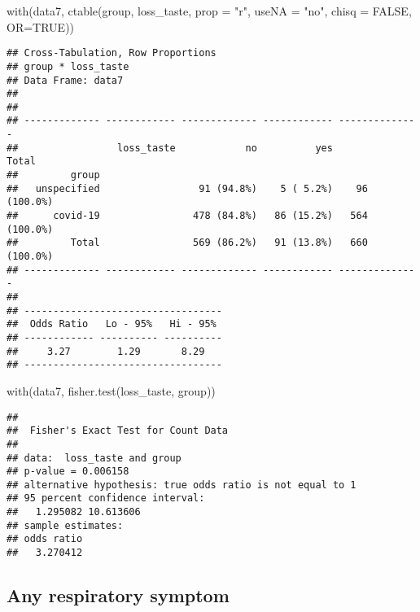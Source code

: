 \documentclass[
]{article}
\newenvironment{Shaded}{\begin{snugshade}}{\end{snugshade}}
\newcommand{\AttributeTok}[1]{\textcolor[rgb]{0.77,0.63,0.00}{#1}}
\newcommand{\ConstantTok}[1]{\textcolor[rgb]{0.00,0.00,0.00}{#1}}
\newcommand{\FunctionTok}[1]{\textcolor[rgb]{0.00,0.00,0.00}{#1}}
\newcommand{\NormalTok}[1]{#1}
\newcommand{\StringTok}[1]{\textcolor[rgb]{0.31,0.60,0.02}{#1}}
\begin{document}
\begin{Shaded}
\begin{Highlighting}[]
\FunctionTok{with}\NormalTok{(data7, }\FunctionTok{ctable}\NormalTok{(group, loss\_taste, }\AttributeTok{prop =} \StringTok{"r"}\NormalTok{, }\AttributeTok{useNA =} \StringTok{"no"}\NormalTok{, }\AttributeTok{chisq =} \ConstantTok{FALSE}\NormalTok{, }\AttributeTok{OR=}\ConstantTok{TRUE}\NormalTok{))}
\end{Highlighting}
\end{Shaded}

\begin{verbatim}
## Cross-Tabulation, Row Proportions  
## group * loss_taste  
## Data Frame: data7  
## 
## 
## ------------- ------------ ------------- ------------ --------------
##                 loss_taste            no          yes          Total
##         group                                                       
##   unspecified                 91 (94.8%)    5 ( 5.2%)    96 (100.0%)
##      covid-19                478 (84.8%)   86 (15.2%)   564 (100.0%)
##         Total                569 (86.2%)   91 (13.8%)   660 (100.0%)
## ------------- ------------ ------------- ------------ --------------
## 
## ----------------------------------
##  Odds Ratio   Lo - 95%   Hi - 95% 
## ------------ ---------- ----------
##     3.27        1.29       8.29   
## ----------------------------------
\end{verbatim}

\begin{Shaded}
\begin{Highlighting}[]
\FunctionTok{with}\NormalTok{(data7, }\FunctionTok{fisher.test}\NormalTok{(loss\_taste, group))}
\end{Highlighting}
\end{Shaded}

\begin{verbatim}
## 
##  Fisher's Exact Test for Count Data
## 
## data:  loss_taste and group
## p-value = 0.006158
## alternative hypothesis: true odds ratio is not equal to 1
## 95 percent confidence interval:
##   1.295082 10.613606
## sample estimates:
## odds ratio 
##   3.270412
\end{verbatim}

\hypertarget{any-respiratory-symptom}{%
\subsection{Any respiratory symptom}\label{any-respiratory-symptom}}
\end{document}
